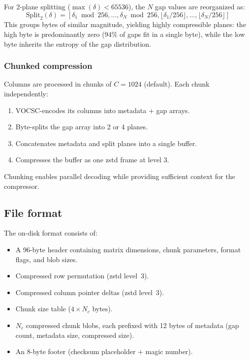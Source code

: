 \documentclass[10pt,twocolumn,letterpaper]{article}
\begin{document}
For 2-plane splitting ($\max(\delta) < 65536$), the $N$ gap values are reorganized as:
\begin{equation}
\text{Split}_2(\delta) = [\delta_1 \bmod 256, \ldots, \delta_N \bmod 256, \lfloor \delta_1/256 \rfloor, \ldots, \lfloor \delta_N/256 \rfloor]
\end{equation}
This groups bytes of similar magnitude, yielding highly compressible planes: the high byte is predominantly zero (94\% of gaps fit in a single byte), while the low byte inherits the entropy of the gap distribution.

\subsubsection{Chunked compression}
Columns are processed in chunks of $C = 1024$ (default).
Each chunk independently:
\begin{enumerate}
\item VOCSC-encodes its columns into metadata + gap arrays.
\item Byte-splits the gap array into 2 or 4 planes.
\item Concatenates metadata and split planes into a single buffer.
\item Compresses the buffer as one zstd frame at level 3.
\end{enumerate}
Chunking enables parallel decoding while providing sufficient context for the compressor.

\subsection{File format}

The on-disk format consists of:
\begin{itemize}
\item A 96-byte header containing matrix dimensions, chunk parameters, format flags, and blob sizes.
\item Compressed row permutation (zstd level~3).
\item Compressed column pointer deltas (zstd level~3).
\item Chunk size table ($4 \times N_c$ bytes).
\item $N_c$ compressed chunk blobs, each prefixed with 12 bytes of metadata (gap count, metadata size, compressed size).
\item An 8-byte footer (checksum placeholder + magic number).
\end{itemize}
\end{document}
